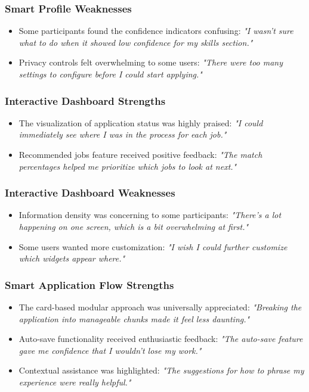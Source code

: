 \documentclass[
	letterpaper, %
]{jdf}
\begin{document}
\subsubsection{Smart Profile Weaknesses}
\begin{itemize}
    \item Some participants found the confidence indicators confusing: \textit{"I wasn't sure what to do when it showed low confidence for my skills section."}
    \item Privacy controls felt overwhelming to some users: \textit{"There were too many settings to configure before I could start applying."}
\end{itemize}

\subsubsection{Interactive Dashboard Strengths}
\begin{itemize}
    \item The visualization of application status was highly praised: \textit{"I could immediately see where I was in the process for each job."}
    \item Recommended jobs feature received positive feedback: \textit{"The match percentages helped me prioritize which jobs to look at next."}
\end{itemize}

\subsubsection{Interactive Dashboard Weaknesses}
\begin{itemize}
    \item Information density was concerning to some participants: \textit{"There's a lot happening on one screen, which is a bit overwhelming at first."}
    \item Some users wanted more customization: \textit{"I wish I could further customize which widgets appear where."}
\end{itemize}

\subsubsection{Smart Application Flow Strengths}
\begin{itemize}
    \item The card-based modular approach was universally appreciated: \textit{"Breaking the application into manageable chunks made it feel less daunting."}
    \item Auto-save functionality received enthusiastic feedback: \textit{"The auto-save feature gave me confidence that I wouldn't lose my work."}
    \item Contextual assistance was highlighted: \textit{"The suggestions for how to phrase my experience were really helpful."}
\end{itemize}
\end{document}
